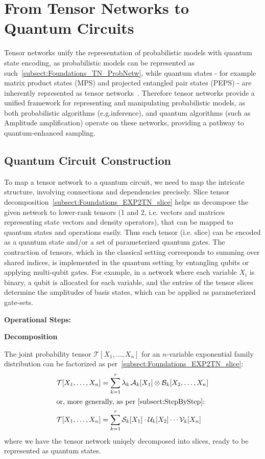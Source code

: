 \documentclass[encoding=utf8,british]{tumphthesis}
\begin{document}
    \section{From Tensor Networks to Quantum Circuits}
    \label{sect:TN2Quantum}
        Tensor networks unify the representation of probabilistic models with quantum state encoding, as probabilistic models can be represented as such~\ref{subsect:Foundations_TN_ProbNetw},
        while quantum states - for example matrix product states (MPS) and projected entangled pair states (PEPS) - are inherently represented as tensor networks~\cite{TNforQC}.
        Therefore tensor networks provide a unified framework for representing and manipulating probabilistic models, as both probabilistic algorithms (e.g.inference),
        and quantum algorithms (such as Amplitude amplification) operate on these networks, providing a pathway to quantum-enhanced sampling.
        
        \subsection{Quantum Circuit Construction}
        \label{sect:TN2Quantum_construction}
            To map a tensor network to a quantum circuit, we need to map the intricate structure, involving connections and dependencies precisely.
            Slice tensor decomposition~\ref{subsect:Foundations_EXP2TN_slice} helps us decompose the given network to lower-rank tensors (1 and 2, i.e. 
            vectors and matrices representing state vectors and density operators), that can be mapped to quantum states and operations easily. 
            Thus each tensor (i.e. slice) can be encoded as a quantum state and/or a set of parameterized 
            quantum gates. The contraction of tensors, which in the classical setting corresponds to summing over shared indices, is implemented 
            in the quantum setting by entangling qubits or applying multi-qubit gates. For example, in a network where each variable $X_i$ 
            is binary, a qubit is allocated for each variable, and the entries of the tensor slices determine the amplitudes of basis 
            states, which can be applied as parameterized gate-sets.
        
        \newpage
        \textbf{Operational Steps:}

        \textbf{Decomposition}

            The joint probability tensor $\mathcal{T}[X_1, \ldots, X_n]$ for an $n$-variable exponential family distribution can be factorized as per~\ref{subsect:Foundations_EXP2TN_slice}: 
            \begin{align*}
                \mathcal{T}[X_1, \ldots, X_n] &= \sum_{k=1}^r \lambda_k \, \mathcal{A}_k[X_1] \otimes \mathcal{B}_k[X_2, \ldots, X_n]\\
                \intertext{or, more generally, as per~\ref{subsect:StepByStep}:}   
                \mathcal{T}[X_1, \ldots, X_n] &= \sum_{k=1}^r \mathcal{S}_k[X_1] \cdot \mathcal{U}_k[X_2] \cdots \mathcal{V}_k[X_n]
            \end{align*}
            where we have the tensor network uniqely decomposed into slices, ready to be represented as quantum states.
\end{document}
